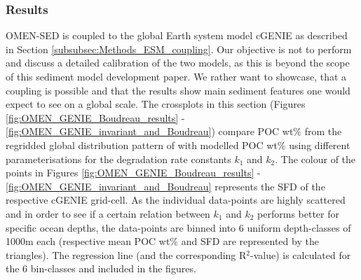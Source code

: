 \documentclass[gmd, manuscript]{copernicus}
\begin{document}
\subsubsection{Results}
OMEN-SED is coupled to the global Earth system model cGENIE as described in Section \ref{subsubsec:Methods_ESM_coupling}. 
Our objective is not to perform and discuss a detailed calibration of the two models, as this is beyond the scope of this sediment model development paper. We rather want to showcase, that a coupling is
possible and that the results show main sediment features one would expect to see on a global scale. 
The crossplots in this section (Figures \ref{fig:OMEN_GENIE_Boudreau_results} - \ref{fig:OMEN_GENIE_invariant_and_Boudreau}) 
compare POC wt\% from the regridded global distribution pattern of \citet{seiter_organic_2004} with modelled POC wt\% using different parameterisations for the degradation rate constants $k_1$ and $k_2$. 
The colour of the points in Figures \ref{fig:OMEN_GENIE_Boudreau_results} - \ref{fig:OMEN_GENIE_invariant_and_Boudreau} represents the SFD of the respective cGENIE grid-cell. As the individual data-points are highly scattered and 
in order to see if a certain relation between $k_1$ and $k_2$ performs better for specific ocean depths, the data-points are binned into 6 uniform depth-classes of 1000m each (respective mean POC wt\% and SFD are represented by 
the triangles). The regression line (and the corresponding R$^2$-value) is calculated for the 6 bin-classes and included in the figures.
\end{document}
